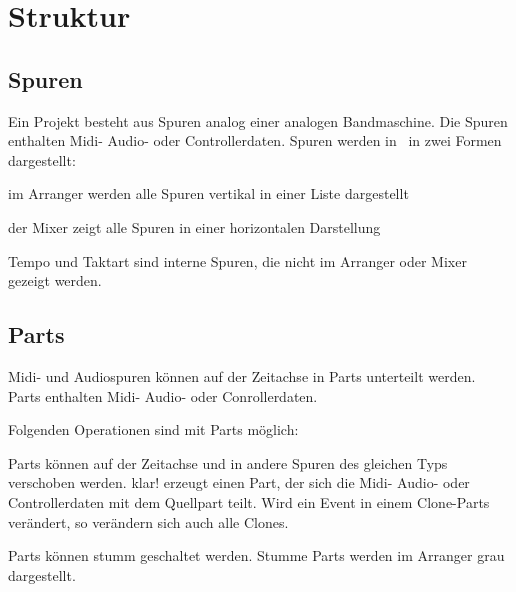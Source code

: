 \chapter{Struktur}
  \section{Spuren}

      Ein Projekt besteht aus Spuren analog einer analogen Bandmaschine.
      Die Spuren enthalten Midi- Audio- oder Controllerdaten.
      Spuren werden in \M\ in zwei Formen dargestellt:

      \blank[big]
       im Arranger werden alle Spuren vertikal in einer
            Liste dargestellt

       der Mixer zeigt alle Spuren in einer horizontalen
            Darstellung\par

      \blank[big]

      Tempo und Taktart sind interne Spuren, die nicht im Arranger oder
      Mixer gezeigt werden.

  \section{Parts}

      Midi- und Audiospuren können auf der Zeitachse in Parts unterteilt
      werden. Parts enthalten Midi- Audio- oder Conrollerdaten.

      Folgenden Operationen sind mit Parts möglich:

      \blank[big]
       Parts können auf der Zeitachse und in andere
            Spuren des gleichen Typs verschoben werden.
       klar!
       erzeugt einen Part, der sich die Midi- Audio- oder
            Controllerdaten mit dem Quellpart teilt. Wird ein Event in
            einem Clone-Parts verändert, so verändern sich auch alle
            Clones.

       Parts können stumm geschaltet werden. Stumme Parts
            werden im Arranger grau dargestellt.

      \par
      \blank[big]



